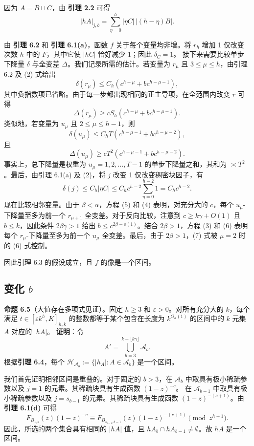 \documentclass[11pt]{article}
\theoremstyle{break}
\begin{document}
因为 $A = B \sqcup C$，由 \textbf{引理 2.2} 可得
\begin{equation}
|hA|_{j,b} = \sum_{\eta=0}^{h} |\eta C| \, |(h-\eta) B|. \label{eq:2}
\end{equation}

由 \textbf{引理 6.2} 和 \textbf{引理 6.1(a)}，函数 $f$ 关于每个变量均非增。将 $r_h$ 增加 1 仅改变次数 $h$ 中的 $F$，其中它使 $|hC|$ 恰好减少 1；因此 $\delta_C = 1$。
接下来需要比较单步下降量 \(\delta\) 与全变差 \(\Delta\)。我们记录所需的估计。若变量为 \(r_\mu\) 且 \(3 \le \mu \le h\)，由引理 6.2 及 (2) 式给出
\[
\delta(r_\mu) \le C_h \left( c^{h-\mu} + b c^{h-\mu-1} \right),
\]
其中负指数项已省略。由于每一步都出现相同的正主导项，在全范围内改变 \(r\) 可得
\[
\Delta(r_\mu) \ge c S_h \left( c^{h-\mu} + b c^{h-\mu-1} \right).
\]
类似地，若变量为 \(u_\mu\) 且 \(2 \le \mu \le h-1\)，则
\[
\delta(u_\mu) \le C_h T \left( c^{h-\mu-1} + b c^{h-\mu-2} \right),
\]
且
\[
\Delta(u_\mu) \ge c T^2 \left( c^{h-\mu-1} + b c^{h-\mu-2} \right).
\]
事实上，总下降量是权重为 \(u_\mu = 1,2,\dots,T-1\) 的单步下降量之和，其和为 \(\asymp T^2\)。最后，由引理 6.1(a) 及 (2)，将 \(j\) 改变 1 仅改变稠密块因子，有
\[
\delta(j) \le C_h |\eta C| \le C_h c^{h-2} \sum_{\eta=0}^{h-2} 1 = C_h c^{h-2}.
\]
现在比较相邻变量。由于 \(\beta < \alpha\)，方程 (5) 和 (4) 表明，对充分大的 \(c\)，每个 \(u_\mu\)-下降量至多为前一个 \(r_{\mu+1}\) 全变差。对于反向比较，注意到 \(c \ge k\gamma + O(1)\) 且 \(b \le k\)，因此条件 \(2\beta\gamma > 1\) 给出 \(b \le c^{2\beta - o(1)}\)。结合 \(2\beta > 1\)，方程 (3) 和 (6) 表明每个 \(r_\mu\)-下降量至多为前一个 \(u_\mu\) 全变差。最后，由于 \(2\beta > 1\)，(7) 式被 \(\mu=2\) 时的 (6) 式控制。

因此引理 6.3 的假设成立，且 \(f\) 的像是一个区间。
\subsection{变化 \(b\)}
\textbf{命题 6.5}（大值存在多项式见证）。固定 $h \ge 3$ 和 $\varepsilon > 0$。对所有充分大的 $k$，每个满足 $t \in [\varepsilon k^{h}, K]_{h,k}$ 的整数都等于某个包含在长度为 $k^{O_h(1)}$ 的区间中的 $k$ 元集 $A$ 对应的 $|hA|$。
\textbf{证明}：令
\[
A' = \bigcup_{b=3}^{k-\lfloor k\gamma \rfloor} \mathcal{A}_b.
\]
根据\textbf{引理 6.4}，每个 $\mathcal{H}_{\mathcal{A}_b} := \{ |h_A| : A \in \mathcal{A}_b \}$ 是一个区间。

我们首先证明相邻区间是重叠的。对于固定的 $b > 3$，在 $\mathcal{A}_b$ 中取具有极小稀疏参数以及 $j = 1$ 的元素。其稀疏块具有生成函数 $(1-z)^{-c}$。
在 $\mathcal{A}_{b-1}$ 中取具有极小稀疏参数以及 $j = s_{b-1}$ 的元素。其稀疏块具有生成函数 $(1-z)^{-(c+1)}$。由\textbf{引理 6.1(d)} 可得
\[
F_{B_{1,b}}(z)(1-z)^{-c} \equiv F_{B_{s_{b-1},b-1}}(z)(1-z)^{-(c+1)} \pmod{z^{h+1}}.
\]
因此，所选的两个集合具有相同的 $|hA|$ 值，且 $hA_b \cap hA_{b-1} \neq \emptyset$。故 $hA$ 是一个区间。
\end{document}
